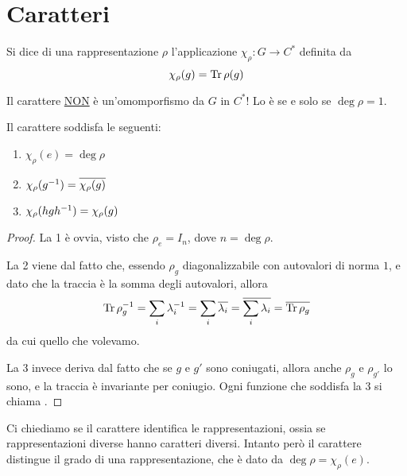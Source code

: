\documentclass[a4paper,10pt,oneside]{math_article}
\newcommand{\id}{I}
\let\conj\overline
\begin{document}
  
  \section{Caratteri}
    
    \begin{mydef}
     Si dice  di una rappresentazione $\rho$ l'applicazione $\chi_\rho: G \rightarrow C^*$ definita da 
     \[
      \chi_\rho(g)=\operatorname{Tr} \rho(g)
     \]
    \end{mydef}
    
    \begin{Achtung}
      Il carattere \underline{NON} è un'omomporfismo da $G$ in $C^*$! Lo è se e solo se $\deg \rho = 1$. 
    \end{Achtung}

    \begin{myprop}
      Il carattere soddisfa le seguenti:
      \begin{enumerate}
       \item $\chi_\rho(e)=\deg\rho$
       \item $\chi_\rho(g\inv)=\conj{\chi_\rho(g)}$
       \item $\chi_\rho(hgh^{-1})=\chi_\rho(g)$
      \end{enumerate}

    \end{myprop}
    \begin{proof}
     La 1 è ovvia, visto che $\rho_e= \id_n$, dove $n=\deg \rho$.
     
     La 2 viene dal fatto che, essendo $\rho_g$ diagonalizzabile con autovalori di norma $1$, e dato che la traccia è la somma degli autovalori, allora
     \[
      \Tr\rho_g\inv = \sum_i \lambda_i\inv = \sum_i \conj{\lambda_i} = \conj{\sum_i \lambda_i} = \conj{\Tr\rho_g} 
     \]
     da cui quello che volevamo.
     
     La 3 invece deriva dal fatto che se $g$ e $g'$ sono coniugati, allora anche $\rho_g$ e $\rho_{g'}$ lo sono, e la traccia è invariante per coniugio. Ogni funzione che soddisfa la 3 si chiama .
    \end{proof}
    
    Ci chiediamo se il carattere identifica le rappresentazioni, ossia se rappresentazioni diverse hanno caratteri diversi.
    Intanto però il carattere distingue il grado di una rappresentazione, che è dato da $\deg \rho = \chi_\rho(e)$.
 
\end{document}
